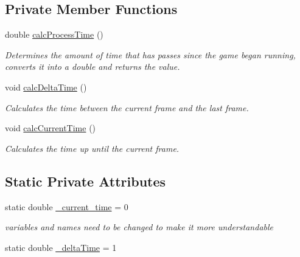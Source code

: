\subsection*{Private Member Functions}
\begin{DoxyCompactItemize}
\item 
double \hyperlink{class_game_time_ac8a380f740f5bc39e98fda3e069c0bb3}{calc\+Process\+Time} ()
\begin{DoxyCompactList}\small\item\em Determines the amount of time that has passes since the game began running, converts it into a double and returns the value. \end{DoxyCompactList}\item 
\mbox{\label{class_game_time_a8575cb09f1e07b90678eedaf92776a97}} 
void \hyperlink{class_game_time_a8575cb09f1e07b90678eedaf92776a97}{calc\+Delta\+Time} ()
\begin{DoxyCompactList}\small\item\em Calculates the time between the current frame and the last frame. \end{DoxyCompactList}\item 
\mbox{\label{class_game_time_aec3fa5e495f783524701418f5d679071}} 
void \hyperlink{class_game_time_aec3fa5e495f783524701418f5d679071}{calc\+Current\+Time} ()
\begin{DoxyCompactList}\small\item\em Calculates the time up until the current frame. \end{DoxyCompactList}\end{DoxyCompactItemize}
\subsection*{Static Private Attributes}
\begin{DoxyCompactItemize}
\item 
static double \hyperlink{class_game_time_a080d9deb72c675f0d68f9ad72eec66c3}{\+\_\+current\+\_\+time} = 0
\begin{DoxyCompactList}\small\item\em variables and names need to be changed to make it more understandable \end{DoxyCompactList}\item 
static double \hyperlink{class_game_time_a39c7a52db277a99fd6dfcb457b432d7d}{\+\_\+delta\+Time} = 1
\end{DoxyCompactItemize}


